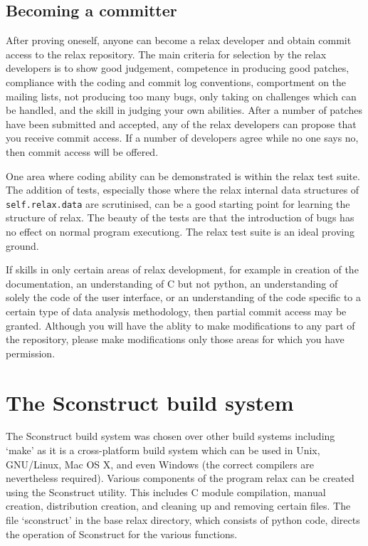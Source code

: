 \subsection{Becoming a committer}

After proving oneself, anyone can become a relax developer and obtain commit access to the relax repository.  The main criteria for selection by the relax developers is to show good judgement, competence in producing good patches, compliance with the coding and commit log conventions, comportment on the mailing lists, not producing too many bugs, only taking on challenges which can be handled, and the skill in judging your own abilities.  After a number of patches have been submitted and accepted, any of the relax developers can propose that you receive commit access.  If a number of developers agree while no one says no, then commit access will be offered.

One area where coding ability can be demonstrated is within the relax test suite.  The addition of tests, especially those where the relax internal data structures of \texttt{self.relax.data} are scrutinised, can be a good starting point for learning the structure of relax.  The beauty of the tests are that the introduction of bugs has no effect on normal program executiong.  The relax test suite is an ideal proving ground.

If skills in only certain areas of relax development, for example in creation of the documentation, an understanding of C but not python, an understanding of solely the code of the user interface, or an understanding of the code specific to a certain type of data analysis methodology, then partial commit access may be granted.  Although you will have the ablity to make modifications to any part of the repository, please make modifications only those areas for which you have permission.





\section{The Sconstruct build system}

The Sconstruct build system was chosen over other build systems including `make' as it is a cross-platform build system which can be used in Unix, GNU/Linux, Mac OS X, and even Windows (the correct compilers are nevertheless required).  Various components of the program relax can be created using the Sconstruct utility.  This includes C module compilation, manual creation, distribution creation, and cleaning up and removing certain files.  The file `sconstruct' in the base relax directory, which consists of python code, directs the operation of Sconstruct for the various functions.


